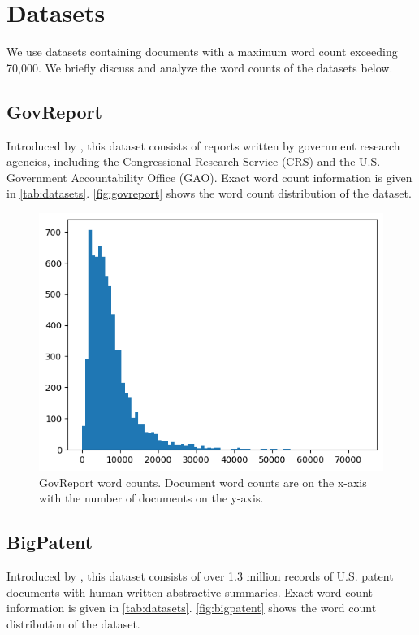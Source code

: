 \section{Datasets}
	\label{sec:datasets}

	We use datasets containing documents with a maximum word count exceeding 70,000.
	We briefly discuss and analyze the word counts of the datasets below.


\subsection*{GovReport}

	Introduced by \citet{huang-etal-2021-efficient}, this dataset consists of reports written
	by government research agencies, including the Congressional Research Service (CRS) and
	the U.S. Government Accountability Office (GAO).
	Exact word count information is given in \autoref{tab:datasets}.
	\autoref{fig:govreport} shows the word count distribution of the dataset.

	\begin{figure}[!ht]
		\centering
		\includegraphics[width=.48\textwidth]{Images/govreport-wordcount.png}
		\caption{
			GovReport word counts.
			Document word counts are on the x-axis with the number of documents on the y-axis.
		}
		\label{fig:govreport}
	\end{figure}


\subsection*{BigPatent}

	Introduced by \citet{sharma-etal-2019-bigpatent}, this dataset consists of over 1.3 million
	records of U.S. patent documents with human-written abstractive summaries.
	Exact word count information is given in \autoref{tab:datasets}.
	\autoref{fig:bigpatent} shows the word count distribution of the dataset.

